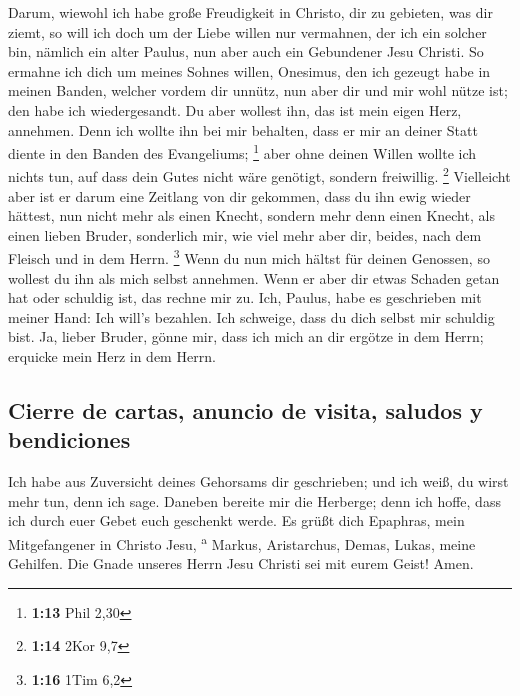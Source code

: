  Darum, wiewohl ich habe große Freudigkeit in Christo, dir
zu gebieten, was dir ziemt,  so will ich doch um der Liebe
willen nur vermahnen, der ich ein solcher bin, nämlich ein alter Paulus,
nun aber auch ein Gebundener Jesu Christi.  So ermahne
ich dich um meines Sohnes willen, Onesimus, den ich gezeugt habe in
meinen Banden,  welcher vordem dir unnütz, nun aber dir
und mir wohl nütze ist; den habe ich wiedergesandt.  Du
aber wollest ihn, das ist mein eigen Herz, annehmen. 
Denn ich wollte ihn bei mir behalten, dass er mir an deiner Statt diente
in den Banden des Evangeliums; \footnote{\textbf{1:13} Phil 2,30}
 aber ohne deinen Willen wollte ich nichts tun, auf dass
dein Gutes nicht wäre genötigt, sondern freiwillig. \footnote{\textbf{1:14}
  2Kor 9,7}  Vielleicht aber ist er darum eine Zeitlang
von dir gekommen, dass du ihn ewig wieder hättest,  nun
nicht mehr als einen Knecht, sondern mehr denn einen Knecht, als einen
lieben Bruder, sonderlich mir, wie viel mehr aber dir, beides, nach dem
Fleisch und in dem Herrn. \footnote{\textbf{1:16} 1Tim 6,2}
 Wenn du nun mich hältst für deinen Genossen, so wollest
du ihn als mich selbst annehmen.  Wenn er aber dir etwas
Schaden getan hat oder schuldig ist, das rechne mir zu. 
Ich, Paulus, habe es geschrieben mit meiner Hand: Ich will's bezahlen.
Ich schweige, dass du dich selbst mir schuldig bist.  Ja,
lieber Bruder, gönne mir, dass ich mich an dir ergötze in dem Herrn;
erquicke mein Herz in dem Herrn.

\hypertarget{cierre-de-cartas-anuncio-de-visita-saludos-y-bendiciones}{%
\subsection{Cierre de cartas, anuncio de visita, saludos y
bendiciones}\label{cierre-de-cartas-anuncio-de-visita-saludos-y-bendiciones}}

 Ich habe aus Zuversicht deines Gehorsams dir
geschrieben; und ich weiß, du wirst mehr tun, denn ich sage.
 Daneben bereite mir die Herberge; denn ich hoffe, dass
ich durch euer Gebet euch geschenkt werde.  Es grüßt dich
Epaphras, mein Mitgefangener in Christo Jesu, \textsuperscript{a}
 Markus, Aristarchus, Demas, Lukas, meine Gehilfen.
 Die Gnade unseres Herrn Jesu Christi sei mit eurem
Geist! Amen.
